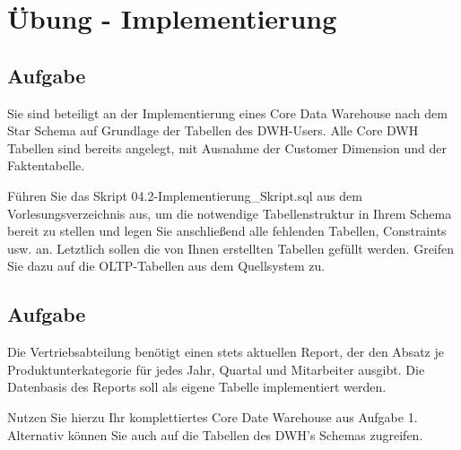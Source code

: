 \section{Übung - Implementierung}
\label{sec:uebung_05}

\label{subsec:uebung_05.aufgabe_01}
\subsection{Aufgabe}
Sie sind beteiligt an der Implementierung eines Core Data Warehouse nach dem Star Schema auf Grundlage der Tabellen des DWH-Users. Alle Core DWH Tabellen sind bereits angelegt, mit Ausnahme der Customer Dimension und der Faktentabelle.

Führen Sie das Skript 04.2-Implementierung\_Skript.sql aus dem Vorlesungsverzeichnis aus, um die notwendige Tabellenstruktur in Ihrem Schema bereit zu stellen und legen Sie anschließend alle fehlenden Tabellen, Constraints usw. an. Letztlich sollen die von Ihnen erstellten Tabellen gefüllt werden. Greifen Sie dazu auf die OLTP-Tabellen aus dem Quellsystem zu.


\label{subsec:uebung_05.aufgabe_02}
\subsection{Aufgabe}
Die Vertriebsabteilung benötigt einen stets aktuellen Report, der den Absatz je Produktunterkategorie für jedes Jahr, Quartal und Mitarbeiter ausgibt. Die Datenbasis des Reports soll als eigene Tabelle implementiert werden.

Nutzen Sie hierzu Ihr komplettiertes Core Date Warehouse aus Aufgabe 1. Alternativ können Sie auch auf die Tabellen des DWH's Schemas zugreifen.


